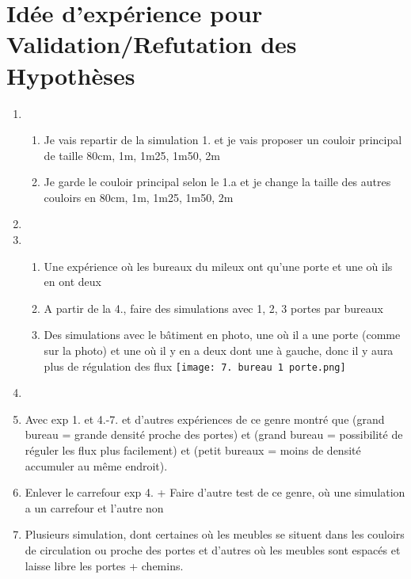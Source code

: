 \documentclass[12pt]{article}
\begin{document}
\section{Idée d'expérience pour Validation/Refutation des Hypothèses}

\begin{enumerate}

    \item
    \begin{enumerate}
        \item Je vais repartir de la simulation 1. et je vais proposer un couloir principal de taille 80cm, 1m, 1m25, 1m50, 2m
        \item Je garde le couloir principal selon le 1.a et je change la taille des autres couloirs en 80cm, 1m, 1m25, 1m50, 2m
    \end{enumerate}

    \item 
    
    \item 
    \begin{enumerate}
        \item Une expérience où les bureaux du mileux ont qu'une porte et une où ils en ont deux
        \item A partir de la 4., faire des simulations avec 1, 2, 3 portes par bureaux  
        \item Des simulations avec le bâtiment en photo, une où il a une porte (comme sur la photo) et une où il y en a deux dont une à gauche, donc il y aura plus de régulation des flux
        \newline\texttt{[image: 7. bureau 1 porte.png]}\newline
    \end{enumerate}

    \item
    
    \item Avec exp 1. et 4.-7. et d'autres expériences de ce genre montré que (grand bureau = grande densité proche des portes) et (grand bureau = possibilité de réguler les flux plus facilement) et (petit
    bureaux = moins de densité accumuler au même endroit).
    
    \item Enlever le carrefour exp 4. + Faire d'autre test de ce genre, où une simulation a un carrefour et l'autre non
    
    \item Plusieurs simulation, dont certaines où les meubles se situent dans les couloirs de circulation ou proche des portes et d'autres où les meubles sont espacés et laisse libre les portes + chemins.
    
    

\end{enumerate}
\end{document}

